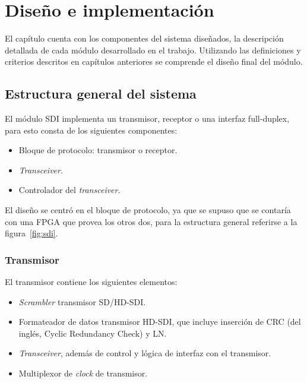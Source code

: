 \chapter{Diseño e implementación}\label{Chapter3}

El capítulo cuenta con los componentes del sistema diseñados, la descripción
detallada de cada módulo desarrollado en el trabajo. Utilizando las definiciones
y criterios descritos en capítulos anteriores se comprende el diseño final del módulo.


\section{Estructura general del sistema}

  El módulo SDI implementa un transmisor, receptor o una interfaz full-duplex,
  para esto consta de los siguientes componentes:

  \begin{itemize}
      \item Bloque de protocolo: transmisor o receptor.
      \item \textit{Transceiver}.
      \item Controlador del \textit{transceiver}.
  \end{itemize}


  El diseño se centró en el bloque de protocolo, ya que se supuso que se contaría con
  una FPGA que provea los otros dos, para la estructura general referirse a la
  figura~\ref{fig:sdi}.

\subsection{Transmisor}

  El transmisor contiene los siguientes elementos:

  \begin{itemize}
      \item \textit{Scrambler} transmisor SD/HD-SDI\@.
      \item Formateador de datos transmisor HD-SDI, que incluye inserción de CRC  (del inglés, Cyclic Redundancy Check) y LN\@.
      \item \textit{Transceiver}, además de control y lógica de interfaz con el transmisor.
      \item Multiplexor de \textit{clock} de transmisor.
  \end{itemize}

